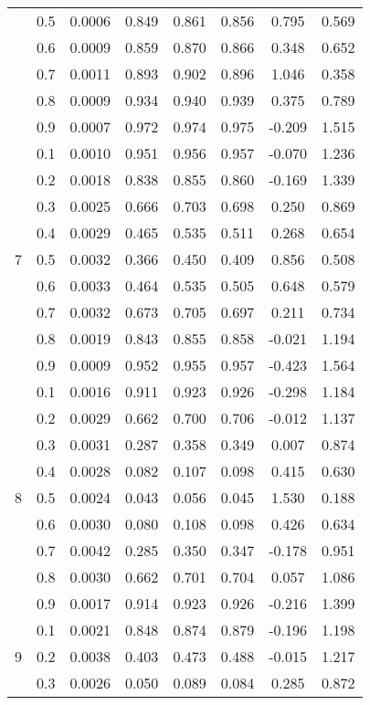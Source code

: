 \documentclass[11pt,a4paper]{report}
\begin{document}
\begin{longtable}{ | c | c || c | c | c | c | c | c | }
 & 0.5 & 0.0006 & 0.849 & 0.861 & 0.856 & 0.795 & 0.569 \\
 & 0.6 & 0.0009 & 0.859 & 0.870 & 0.866 & 0.348 & 0.652 \\
 & 0.7 & 0.0011 & 0.893 & 0.902 & 0.896 & 1.046 & 0.358 \\
 & 0.8 & 0.0009 & 0.934 & 0.940 & 0.939 & 0.375 & 0.789 \\
 & 0.9 & 0.0007 & 0.972 & 0.974 & 0.975 & -0.209 & 1.515 \\
 \hline
\multirow{9}{*}{7} & 0.1 & 0.0010 & 0.951 & 0.956 & 0.957 & -0.070 & 1.236 \\
 & 0.2 & 0.0018 & 0.838 & 0.855 & 0.860 & -0.169 & 1.339 \\
 & 0.3 & 0.0025 & 0.666 & 0.703 & 0.698 & 0.250 & 0.869 \\
 & 0.4 & 0.0029 & 0.465 & 0.535 & 0.511 & 0.268 & 0.654 \\
 & 0.5 & 0.0032 & 0.366 & 0.450 & 0.409 & 0.856 & 0.508 \\
 & 0.6 & 0.0033 & 0.464 & 0.535 & 0.505 & 0.648 & 0.579 \\
 & 0.7 & 0.0032 & 0.673 & 0.705 & 0.697 & 0.211 & 0.734 \\
 & 0.8 & 0.0019 & 0.843 & 0.855 & 0.858 & -0.021 & 1.194 \\
 & 0.9 & 0.0009 & 0.952 & 0.955 & 0.957 & -0.423 & 1.564 \\
 \hline
\multirow{9}{*}{8} & 0.1 & 0.0016 & 0.911 & 0.923 & 0.926 & -0.298 & 1.184 \\
 & 0.2 & 0.0029 & 0.662 & 0.700 & 0.706 & -0.012 & 1.137 \\
 & 0.3 & 0.0031 & 0.287 & 0.358 & 0.349 & 0.007 & 0.874 \\
 & 0.4 & 0.0028 & 0.082 & 0.107 & 0.098 & 0.415 & 0.630 \\
 & 0.5 & 0.0024 & 0.043 & 0.056 & 0.045 & 1.530 & 0.188 \\
 & 0.6 & 0.0030 & 0.080 & 0.108 & 0.098 & 0.426 & 0.634 \\
 & 0.7 & 0.0042 & 0.285 & 0.350 & 0.347 & -0.178 & 0.951 \\
 & 0.8 & 0.0030 & 0.662 & 0.701 & 0.704 & 0.057 & 1.086 \\
 & 0.9 & 0.0017 & 0.914 & 0.923 & 0.926 & -0.216 & 1.399 \\
 \hline
\multirow{9}{*}{9} & 0.1 & 0.0021 & 0.848 & 0.874 & 0.879 & -0.196 & 1.198 \\
 & 0.2 & 0.0038 & 0.403 & 0.473 & 0.488 & -0.015 & 1.217 \\
 & 0.3 & 0.0026 & 0.050 & 0.089 & 0.084 & 0.285 & 0.872 \\

\end{longtable}
\end{document}
